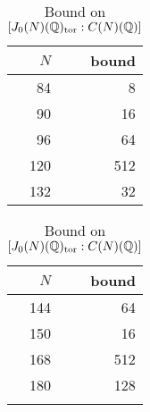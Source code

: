 \begin{table}%
    \label{tab:rank_zero_bound}
    \caption{Bound on $[J_0(N)(\mathbb{Q})_{\mathrm{tor}}:C(N)(\mathbb{Q})]$}
    \centering
    \begin{tabular}{rr}
        \toprule
        $N$ & bound \\
        \midrule
        84 & 8 \\
        90 & 16 \\
        96 & 64 \\
        120 & 512 \\
        132 & 32 \\
        \bottomrule
    \end{tabular}
    \begin{tabular}{rr}
        \toprule
        $N$ & bound \\
        \midrule
        144 & 64 \\
        150 & 16 \\
        168 & 512 \\
        180 & 128  \\
            &  \\
        \bottomrule
    \end{tabular}
\end{table}
